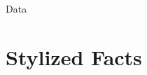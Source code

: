\documentclass[9pt]{beamer}
\begin{document}
\begin{frame}{Data}
  
  
       
\end{frame}

\section{Stylized Facts}

\end{document}
